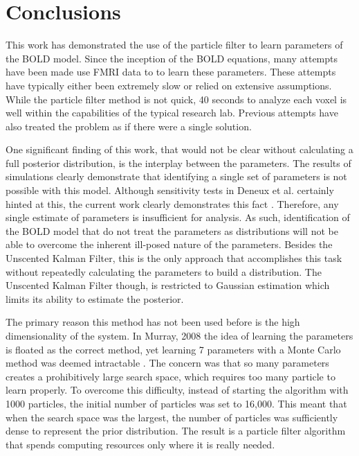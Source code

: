 \chapter{Conclusions}
\label{sec:Conclusion}
This work has demonstrated the use of the particle filter to
learn parameters of the BOLD model. Since the inception of the
BOLD equations, many attempts have been made use FMRI data to 
to learn these parameters. These attempts have typically either been extremely 
slow or relied on extensive assumptions. While the particle filter method
is not quick, 40 seconds to analyze each voxel is well within the capabilities
of the typical research lab. Previous attempts have also treated
the problem as if there were a single solution.

One significant finding of this work, that would not be clear without 
calculating a full posterior distribution, is the interplay 
between the parameters. The results of simulations clearly demonstrate
that identifying a single set of parameters is not possible with this 
model. Although sensitivity tests in Deneux et al. certainly hinted
at this, the current work clearly demonstrates this fact \cite{Deneux2006}. Therefore,
any single estimate of parameters is insufficient for analysis. As such,
identification of the BOLD model that do not treat the parameters as distributions
will not be able to overcome the inherent ill-posed nature of the
parameters. Besides the Unscented Kalman Filter, this is the only approach
that accomplishes this task without repeatedly calculating the parameters 
to build a distribution. The Unscented Kalman Filter though, is restricted
to Gaussian estimation which limits its ability to estimate the posterior. 

The primary reason this method has not been used before is the high 
dimensionality of the system. In Murray, 2008 the idea of learning
the parameters is floated as the correct method, yet 
learning 7 parameters with a Monte Carlo method was deemed intractable
\cite{Murray2008}. The 
concern was that so many parameters creates a prohibitively large 
search space, which requires too many particle to learn properly. To overcome
this difficulty, instead of starting the algorithm with 1000 particles,
the initial number of particles was set to 16,000. This meant that
when the search space was the largest, the number of particles was
sufficiently dense to represent the prior distribution. The result is
a particle filter algorithm that spends computing resources only where
it is really needed.

